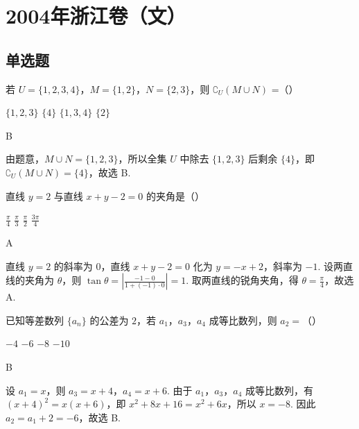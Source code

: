 \chapter{2004年浙江卷（文）}
\section{单选题}
\begin{problem}
若 \(U = \{1, 2, 3, 4\}\)，\(M = \{1, 2\}\)，\(N = \{2, 3\}\)，则 \(\complement_U(M \cup N)\) =（\quad）

\choices
    {\(\{1, 2, 3\}\)}
    {\(\{4\}\)}
    {\(\{1, 3, 4\}\)}
    {\(\{2\}\)}
\end{problem}

\begin{answer}
B
\end{answer}

\begin{solution}
由题意，\(M\cup N=\{1,2,3\}\)，所以全集 \(U\) 中除去 \(\{1,2,3\}\) 后剩余 \(\{4\}\)，即
\(\complement_U(M\cup N)=\{4\}\)，故选 B.
\end{solution}

\begin{problem}
直线 \(y = 2\) 与直线 \(x + y - 2 = 0\) 的夹角是（\quad）

\choices
    {\(\frac{\pi}{4}\)}
    {\(\frac{\pi}{3}\)}
    {\(\frac{\pi}{2}\)}
    {\(\frac{3\pi}{4}\)}
\end{problem}

\begin{answer}
A
\end{answer}

\begin{solution}
直线 \(y=2\) 的斜率为 \(0\)，直线 \(x+y-2=0\) 化为 \(y=-x+2\)，斜率为 \(-1\). 设两直线的夹角为 \(\theta\)，则
\(\tan\theta=\left|\frac{-1-0}{1+(-1)\cdot0}\right|=1\). 取两直线的锐角夹角，得 \(\theta=\frac{\pi}{4}\)，故选 A.
\end{solution}

\begin{problem}
已知等差数列 \(\{a_n\}\) 的公差为 \(2\)，若 \(a_1\)，\(a_3\)，\(a_4\) 成等比数列，则 \(a_2 =\)（\quad）

\choices
    {\(-4\)}
    {\(-6\)}
    {\(-8\)}
    {\(-10\)}
\end{problem}

\begin{answer}
B
\end{answer}

\begin{solution}
设 \(a_1=x\)，则 \(a_3=x+4\)，\(a_4=x+6\). 由于 \(a_1\)，\(a_3\)，\(a_4\) 成等比数列，有
\((x+4)^2=x(x+6)\)，即 \(x^2+8x+16=x^2+6x\)，所以 \(x=-8\). 因此 \(a_2=a_1+2=-6\)，故选 B.
\end{solution}

